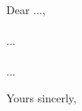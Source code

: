 \documentclass[CoverLetter, en]{lettertemplate}
\begin{document}
    \makeheader

    \noindent
    Dear ...,

    \paragraph{}
        ...

    \paragraph{}
        ...

    \vskip 1cm

    \noindent
    Yours sincerly,

    \sign
\end{document}
